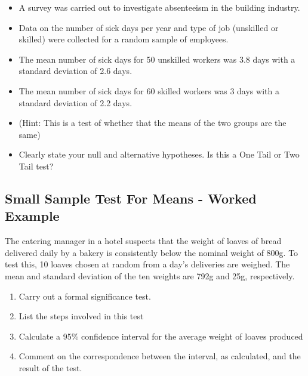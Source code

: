 \begin{enumerate}
\begin{itemize}
\item A survey was carried out to investigate absenteeism in the building industry.
\item Data on the number of sick days per year and type of job (unskilled or skilled)
were collected for a random sample of employees.
\item The mean number of sick days for 50 unskilled workers was 3.8 days with a standard deviation of 2.6 days. 
\item The mean number of sick days for 60 skilled workers was 3 days with a standard deviation of 2.2 days. 
\item (Hint: This is a test of whether that the means of the two groups are the same)

\item Clearly state your null and alternative hypotheses.
Is this a One Tail or Two Tail test?
\end{itemize}

\end{enumerate}








\subsection{Small Sample Test For Means - Worked Example}
The catering manager in a hotel suspects that the weight of loaves of bread delivered
daily by a bakery is consistently below the nominal weight of 800g. To test this,
10 loaves chosen at random from a day’s deliveries are weighed. The mean and
standard deviation of the ten weights are 792g and 25g, respectively.

\begin{enumerate}
\item  Carry out a formal significance test.
\item List the steps involved in this test 
\item Calculate a 95\% confidence interval for the average weight of loaves produced
\item Comment on the correspondence between the interval, as calculated, and the
result of the test.
\end{enumerate}



%
%
%
%
%



